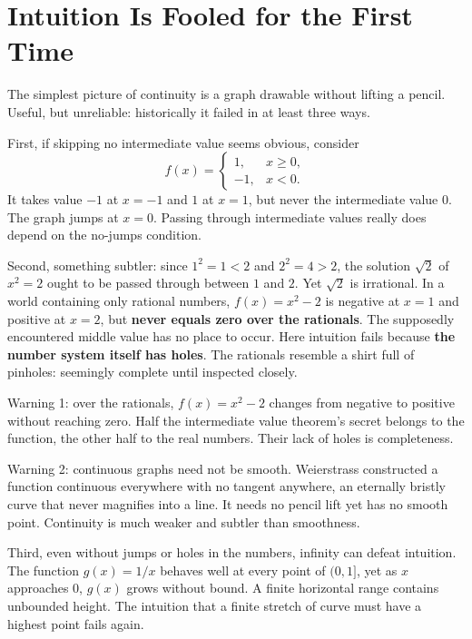 \section{Intuition Is Fooled for the First Time}

The simplest picture of continuity is a graph drawable without lifting a pencil. Useful, but unreliable: historically it failed in at least three ways.

First, if skipping no intermediate value seems obvious, consider
\[
f(x)=\begin{cases}1, & x\ge 0,\\ -1, & x<0.\end{cases}
\]
It takes value $-1$ at $x=-1$ and $1$ at $x=1$, but never the intermediate value $0$. The graph jumps at $x=0$. Passing through intermediate values really does depend on the no-jumps condition.

Second, something subtler: since $1^2=1<2$ and $2^2=4>2$, the solution $\sqrt{2}$ of $x^2=2$ ought to be passed through between $1$ and $2$. Yet $\sqrt{2}$ is irrational. In a world containing only rational numbers, $f(x)=x^2-2$ is negative at $x=1$ and positive at $x=2$, but \textbf{never equals zero over the rationals}. The supposedly encountered middle value has no place to occur. Here intuition fails because \textbf{the number system itself has holes}. The rationals resemble a shirt full of pinholes: seemingly complete until inspected closely.

\begin{fanli}
Warning 1: over the rationals, $f(x)=x^2-2$ changes from negative to positive without reaching zero. Half the intermediate value theorem's secret belongs to the function, the other half to the real numbers. Their lack of holes is completeness.

Warning 2: continuous graphs need not be smooth. Weierstrass constructed a function continuous everywhere with no tangent anywhere, an eternally bristly curve that never magnifies into a line. It needs no pencil lift yet has no smooth point. Continuity is much weaker and subtler than smoothness.
\end{fanli}

Third, even without jumps or holes in the numbers, infinity can defeat intuition. The function $g(x)=1/x$ behaves well at every point of $(0,1]$, yet as $x$ approaches $0$, $g(x)$ grows without bound. A finite horizontal range contains unbounded height. The intuition that a finite stretch of curve must have a highest point fails again.

